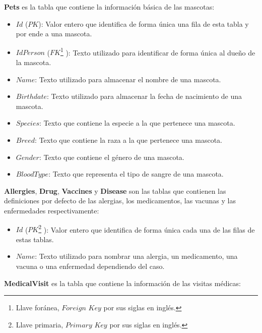 \textbf{Pets} es la tabla que contiene la información básica de las mascotas:

\begin{itemize}
	\item	$Id$ ($PK$): Valor entero que identifica de forma única una fila de esta tabla y por ende a una mascota.
	\item	$IdPerson$  ($FK$\footnote{Llave foránea, $Foreign$ $Key$ por sus siglas en inglés.} ): Texto utilizado para identificar de forma única al dueño de la mascota.
	\item	$Name$: Texto utilizado para almacenar el nombre de una mascota.
	\item	$Birthdate$: Texto utilizado para almacenar la fecha de nacimiento de una mascota.
	\item	$Species$: Texto que contiene la especie a la que pertenece una mascota.
	\item	$Breed$: Texto que contiene la raza a la que pertenece una mascota.
	\item	$Gender$: Texto que contiene el género de una mascota.
	\item	$BloodType$: Texto que representa el tipo de sangre de una mascota.
	
\end{itemize}

\textbf{Allergies}, \textbf{Drug}, \textbf{Vaccines} y \textbf{Disease} son las tablas que contienen las definiciones por defecto de las alergias, los medicamentos, las vacunas y las enfermedades respectivamente:

\begin{itemize}
	\item	$Id$ ($PK$\footnote{Llave primaria, $Primary$  $Key$ por sus siglas en inglés.} ): Valor entero que identifica de forma única cada una de las filas de estas tablas.
	\item	$Name$: Texto utilizado para nombrar una alergia, un medicamento, una vacuna o una enfermedad dependiendo del caso.
	
\end{itemize}

\textbf{MedicalVisit} es la tabla que contiene la información de las visitas médicas:

